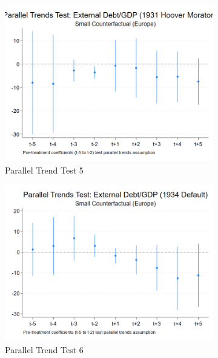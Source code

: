 \begin{figure}[ht!]
\begin{subfigure}[b]{0.48\textwidth}
        \centering
        \includegraphics[width=\textwidth]{figures/PT_ExtDebt_1931.png}
        \caption{Parallel Trend Test 5}
        \label{fig:pt5}
    \end{subfigure}
    \hfill
    \begin{subfigure}[b]{0.48\textwidth}
        \centering
        \includegraphics[width=\textwidth]{figures/PT_ExtDebt_1934.png}
        \caption{Parallel Trend Test 6}
        \label{fig:pt6}
    \end{subfigure}
    \\[1em]
    \begin{subfigure}[b]{0.48\textwidth}
        \centering

\end{subfigure}
\end{figure}
